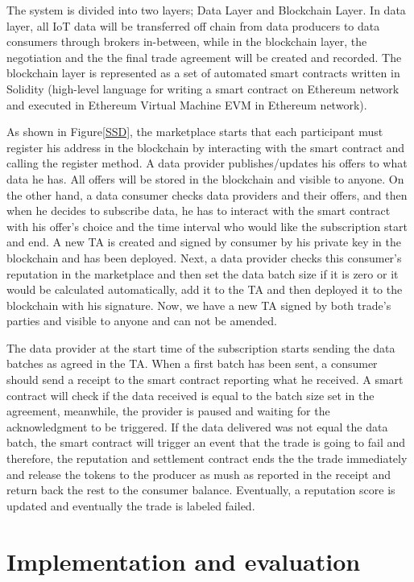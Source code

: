 \documentclass[letterpaper, 10 pt, conference]{ieeeconf}  %
\begin{document}
The system is divided into two layers; Data Layer and Blockchain Layer. In data layer, all IoT data will be transferred off chain from data producers to data consumers through brokers in-between, while in the blockchain layer, the negotiation and the the final trade agreement will be created and recorded. The blockchain layer is represented as a set of automated smart contracts written in Solidity (high-level language for writing a smart contract on Ethereum network and executed in Ethereum Virtual Machine EVM in Ethereum network).

As shown in Figure\ref{SSD}, the marketplace starts that each participant must register his address in the blockchain by interacting with the smart contract and calling the register method. A data provider publishes/updates his offers to what data he has. All offers will be stored in the blockchain and visible to anyone. On the other hand, a data consumer checks data providers and their offers, and then when he decides to subscribe data, he has to interact with the smart contract with his offer’s choice and the time interval who would like the subscription start and end. A new TA is created and signed by consumer by his private key in the blockchain and has been deployed. Next, a data provider checks this consumer’s reputation in the marketplace and then set the data batch size if it is zero or it would be calculated automatically, add it to the TA and then deployed it to the blockchain with his signature. Now, we have a new TA signed by both trade’s parties and visible to anyone and can not be amended. 

The data provider at the start time of the subscription starts sending the data batches as agreed in the TA. When a first batch has been sent, a consumer should send a receipt to the smart contract reporting what he received. A smart contract will check if the data received is equal to the batch size set in the agreement, meanwhile, the provider is paused and waiting for the acknowledgment to be triggered. If the data delivered was not equal the data batch, the smart contract will trigger an event that the trade is going to fail and therefore, the reputation and settlement contract ends the the trade immediately and release the tokens to the producer as mush as reported in the receipt and return back the rest to the consumer balance. Eventually, a reputation score is updated and eventually the trade is labeled failed. 

\section{Implementation and evaluation} \label{Impl&Evaluation}
\end{document}
